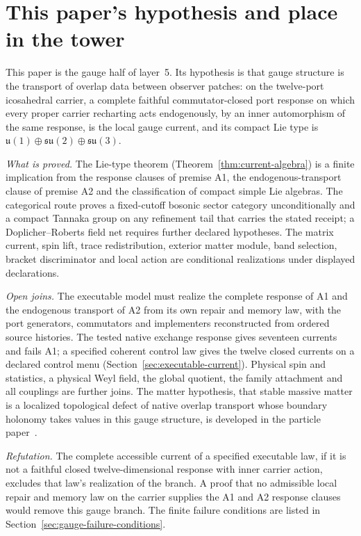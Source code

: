 \documentclass[11pt]{article}
\begin{document}
\section*{This paper's hypothesis and place in the tower}
\label{sec:gauge-hypothesis}

This paper is the gauge half of layer~5. Its hypothesis is that gauge
structure is the transport of overlap data between observer patches: on the
twelve-port icosahedral carrier, a complete faithful commutator-closed port
response on which every proper carrier recharting acts endogenously, by an
inner automorphism of the same response, is the local gauge current, and
its compact Lie type is \(\mathfrak u(1)\oplus\mathfrak{su}(2)\oplus
\mathfrak{su}(3)\).

\emph{What is proved.} The Lie-type theorem
(Theorem~\ref{thm:current-algebra}) is a finite implication from the
response clauses of premise A1, the endogenous-transport clause of premise
A2 and the classification of compact simple Lie algebras. The categorical
route proves a fixed-cutoff bosonic sector category unconditionally and a
compact Tannaka group on any refinement tail that carries the stated
receipt; a Doplicher--Roberts field net requires further declared
hypotheses. The matrix current, spin lift, trace redistribution, exterior
matter module, band selection, bracket discriminator and local action are
conditional realizations under displayed declarations.

\emph{Open joins.} The executable model must realize the complete response
of A1 and the endogenous transport of A2 from its own repair and memory law,
with the port generators, commutators and implementers reconstructed from
ordered source histories. The tested native exchange response gives
seventeen currents and fails A1; a specified coherent control law gives the
twelve closed currents on a declared control menu
(Section~\ref{sec:executable-current}). Physical spin and statistics, a
physical Weyl field, the global quotient, the family attachment and all
couplings are further joins. The matter hypothesis, that stable massive
matter is a localized topological defect of native overlap transport whose
boundary holonomy takes values in this gauge structure, is developed in the
particle paper~\cite{ophparticles}.

\emph{Refutation.} The complete accessible current of a specified executable
law, if it is not a faithful closed twelve-dimensional response with inner
carrier action, excludes that law's realization of the branch. A proof that
no admissible local repair and memory law on the carrier supplies the A1 and
A2 response clauses would remove this gauge branch. The finite failure
conditions are listed in Section~\ref{sec:gauge-failure-conditions}.
\end{document}
